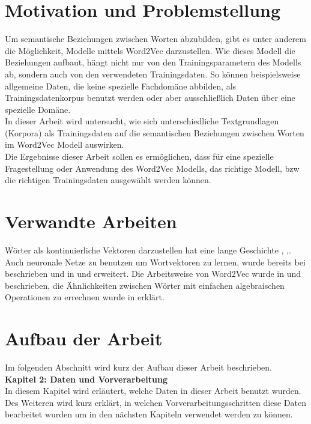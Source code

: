 \documentclass[12pt,a4paper]{report}
\begin{document}
	\section{Motivation und Problemstellung}
	  
	
	Um semantische Beziehungen zwischen Worten abzubilden, gibt es unter anderem die Möglichkeit, Modelle mittels Word2Vec darzustellen. Wie dieses Modell die Beziehungen aufbaut, hängt nicht nur von den Trainingsparametern des Modells ab, sondern auch von den verwendeten Trainingsdaten. So können beispielsweise allgemeine Daten, die keine spezielle Fachdomäne abbilden, als Trainingsdatenkorpus benutzt werden oder aber ausschließlich Daten über eine spezielle Domäne. \\		
	In dieser Arbeit wird untersucht, wie sich unterschiedliche Textgrundlagen (Korpora) als Trainingsdaten auf die semantischen Beziehungen zwischen Worten im Word2Vec Modell auswirken. \\
	Die Ergebnisse dieser Arbeit sollen es ermöglichen, dass für eine spezielle Fragestellung oder Anwendung des Word2Vec Modells, das richtige Modell, bzw die richtigen Trainingsdaten ausgewählt werden können.\\
	


	\section{Verwandte Arbeiten}
	Wörter als kontinuierliche Vektoren darzustellen hat eine lange Geschichte \citep{Hinton86}, \cite{williams1986learning},\cite{elman1990finding}. Auch neuronale Netze zu benutzen um Wortvektoren zu lernen, wurde bereits bei \citep{bengio2003neural} beschrieben und in \cite{mikolovMaster} und \cite{mikolov2009neural} erweitert. Die Arbeitsweise von Word2Vec wurde in \citep{DBLP:journals/corr/abs-1301-3781} und \citep{DBLP:journals/corr/MikolovSCCD13} beschrieben, die Ähnlichkeiten zwischen Wörter mit einfachen algebraischen Operationen zu errechnen wurde in \citep{DBLP:conf/naacl/MikolovYZ13} erklärt.
	
	
	
	\newpage
	\section{Aufbau der Arbeit}
	Im folgenden Abschnitt wird kurz der Aufbau dieser Arbeit beschrieben.\\
	
	\textbf{Kapitel 2: Daten und Vorverarbeitung}\\
	In diesem Kapitel wird erläutert, welche Daten in dieser Arbeit benutzt wurden. Des Weiteren wird kurz erklärt, in welchen Vorverarbeitungsschritten diese Daten bearbeitet wurden um in den nächsten Kapiteln verwendet werden zu können.\\
	
\end{document}
